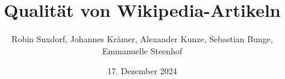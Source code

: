 \documentclass[aspectratio=169]{beamer} %
\title{Qualit\"at von Wikipedia-Artikeln}
\author[R. Suxdorf et al.]{Robin Suxdorf, Johannes Kr\"amer, Alexander Kunze, Sebastian Bunge, Emmanuelle Steenhof}
\institute{Artificial Intelligence Group,\\
University of Hagen, Germany}
\date{17. Dezember 2024}
\begin{document}

\begin{frame}
  \titlepage
\end{frame}
\nologo











\end{document}
